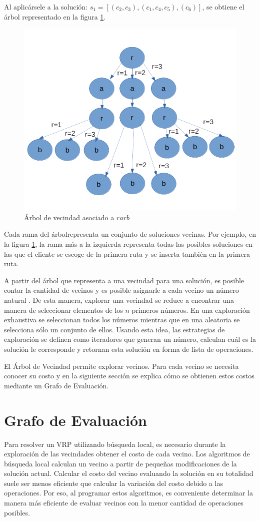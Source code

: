 Al aplicársele a la solución: $s_1 = [(c_2,c_3), (c_1,c_4,c_5), (c_6)]$, se obtiene el árbol representado en la figura \ref{fig:neigh-tree}.

\begin{figure}
	\centering
	\includegraphics[width=0.7\linewidth]{Graphics/Neigh-Tree}
	\caption{Árbol de vecindad asociado a $rarb$}
	\label{fig:neigh-tree}
\end{figure}

Cada rama del árbolrepresenta un conjunto de soluciones vecinas. Por ejemplo, en la figura \ref{fig:neigh-tree}, la rama más a la izquierda representa todas las posibles soluciones en las que el cliente se escoge de la primera ruta y se inserta también en la primera ruta.

A partir del árbol que representa a una vecindad para una solución, es posible contar la cantidad de vecinos y es posible asignarle a cada vecino un número natural \cite{Hector}. De esta manera, explorar una vecindad se reduce a encontrar una manera de seleccionar elementos de los $n$ primeros números. En una exploración exhaustiva se seleccionan todos los números mientras que en una aleatoria se selecciona sólo un conjunto de ellos. Usando esta idea, las estrategias de exploración se definen como iteradores que generan un número, calculan cuál es la solución le corresponde y retornan esta solución en forma de lista de operaciones.

El Árbol de Vecindad permite explorar vecinos. Para cada vecino se necesita conocer su costo y en la siguiente sección se explica cómo se obtienen estos costos mediante un Grafo de Evaluación.

\section{Grafo de Evaluación}\label{2-JJ}
Para resolver un VRP utilizando búsqueda local, es necesario durante la exploración de las vecindades obtener el costo de cada vecino. Los algoritmos de búsqueda local calculan un vecino a partir de pequeñas modificaciones de la solución actual. Calcular el costo del vecino evaluando la solución en su totalidad suele ser menos eficiente que calcular la variación del costo debido a las operaciones. Por eso, al programar estos algoritmos, es conveniente determinar la manera más eficiente de evaluar vecinos con la menor cantidad de operaciones posibles. 

